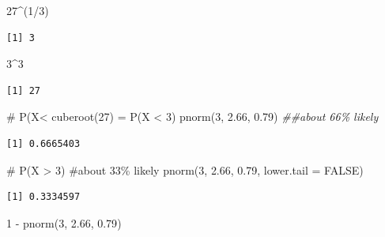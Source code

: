 \documentclass[
  letterpaper,
  DIV=11,
  numbers=noendperiod]{scrreprt}
\newenvironment{Shaded}{\begin{snugshade}}{\end{snugshade}}
\newcommand{\AttributeTok}[1]{\textcolor[rgb]{0.40,0.45,0.13}{#1}}
\newcommand{\CommentTok}[1]{\textcolor[rgb]{0.37,0.37,0.37}{#1}}
\newcommand{\ConstantTok}[1]{\textcolor[rgb]{0.56,0.35,0.01}{#1}}
\newcommand{\DecValTok}[1]{\textcolor[rgb]{0.68,0.00,0.00}{#1}}
\newcommand{\DocumentationTok}[1]{\textcolor[rgb]{0.37,0.37,0.37}{\textit{#1}}}
\newcommand{\FloatTok}[1]{\textcolor[rgb]{0.68,0.00,0.00}{#1}}
\newcommand{\FunctionTok}[1]{\textcolor[rgb]{0.28,0.35,0.67}{#1}}
\newcommand{\NormalTok}[1]{\textcolor[rgb]{0.00,0.23,0.31}{#1}}
\newcommand{\SpecialCharTok}[1]{\textcolor[rgb]{0.37,0.37,0.37}{#1}}
\begin{document}
\begin{Shaded}
\begin{Highlighting}[]
\DecValTok{27}\SpecialCharTok{\^{}}\NormalTok{(}\DecValTok{1}\SpecialCharTok{/}\DecValTok{3}\NormalTok{)}
\end{Highlighting}
\end{Shaded}

\begin{verbatim}
[1] 3
\end{verbatim}

\begin{Shaded}
\begin{Highlighting}[]
\DecValTok{3}\SpecialCharTok{\^{}}\DecValTok{3}
\end{Highlighting}
\end{Shaded}

\begin{verbatim}
[1] 27
\end{verbatim}

\begin{Shaded}
\begin{Highlighting}[]
\CommentTok{\# P(X\textless{} cuberoot(27) = P(X \textless{} 3)}
\FunctionTok{pnorm}\NormalTok{(}\DecValTok{3}\NormalTok{, }\FloatTok{2.66}\NormalTok{, }\FloatTok{0.79}\NormalTok{)  }\DocumentationTok{\#\#about 66\% likely}
\end{Highlighting}
\end{Shaded}

\begin{verbatim}
[1] 0.6665403
\end{verbatim}

\begin{Shaded}
\begin{Highlighting}[]
\CommentTok{\# P(X \textgreater{} 3) \#about 33\% likely}
\FunctionTok{pnorm}\NormalTok{(}\DecValTok{3}\NormalTok{, }\FloatTok{2.66}\NormalTok{, }\FloatTok{0.79}\NormalTok{, }\AttributeTok{lower.tail =} \ConstantTok{FALSE}\NormalTok{)}
\end{Highlighting}
\end{Shaded}

\begin{verbatim}
[1] 0.3334597
\end{verbatim}

\begin{Shaded}
\begin{Highlighting}[]
\DecValTok{1} \SpecialCharTok{{-}} \FunctionTok{pnorm}\NormalTok{(}\DecValTok{3}\NormalTok{, }\FloatTok{2.66}\NormalTok{, }\FloatTok{0.79}\NormalTok{)}
\end{Highlighting}
\end{Shaded}
\end{document}

